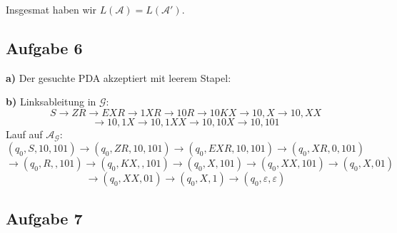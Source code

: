\documentclass[a4paper,graphics,11pt]{article}
\newcommand{\aufgabe}[1]{\subsection*{Aufgabe #1}}
\begin{document}
Insgesmat haben wir $L(\mathcal{A}) = L(\mathcal{A}')$.

\newpage

\aufgabe{6}
\textbf{a)}
Der gesuchte PDA akzeptiert mit leerem Stapel:
\begin{center}
\end{center}

\textbf{b)}
Linksableitung in $\mathcal{G}:$
$$
    S \to ZR \to EXR \to 1XR \to 10R \to 10KX \to 10,X \to 10,XX
$$$$
    \to 10,1X \to 10,1XX \to 10,10X \to 10,101
$$
Lauf auf $\mathcal{A}_\mathcal{G}:$
$$
    (q_0, S, 10,101) \to
    (q_0, ZR, 10,101) \to
    (q_0, EXR, 10,101) \to
    (q_0, XR, 0,101)
$$$$
    \to (q_0, R, ,101)
    \to (q_0, KX, ,101)
    \to (q_0, X, 101)
    \to (q_0, XX, 101)
    \to (q_0, X, 01)
$$$$
    \to (q_0, XX, 01)
    \to (q_0, X, 1)
    \to (q_0, \varepsilon, \varepsilon)
$$

\newpage

\aufgabe{7}
\end{document}
